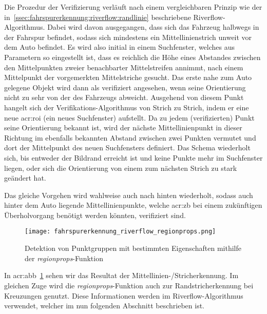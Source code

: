 Die Prozedur der Verifizierung verläuft nach einem vergleichbaren Prinzip wie der in~\ref{ssec:fahrspurerkennung:riverflow:randlinie} beschriebene Riverflow-Algorithmus. Dabei wird davon ausgegangen, dass sich das Fahrzeug halbwegs in der Fahrspur befindet, sodass sich mindestens ein Mittellinienstrich unweit vor dem Auto befindet. Es wird also initial in einem  Suchfenster, welches aus Parametern so eingestellt ist, dass es reichlich die Höhe eines Abstandes zwischen den Mittelpunkten zweier benachbarter Mittelstreifen annimmt, nach einem Mittelpunkt der vorgemerkten Mittelstriche gesucht. Das erste nahe zum Auto gelegene Objekt wird dann als verifiziert angesehen, wenn seine Orientierung nicht zu sehr von der des Fahrzeugs abweicht. Ausgehend von diesem Punkt \glqq hangelt\grqq{} sich der Verifikations-Algorithmus von Strich zu Strich, indem er eine neue \gls{acr:roi} (ein neues Suchfenster) aufstellt. Da zu jedem (verifizierten) Punkt seine Orientierung bekannt ist, wird der nächste Mittellinienpunkt in dieser Richtung im ebenfalls bekannten Abstand zwischen zwei Punkten vermutet und dort der Mittelpunkt des neuen Suchfensters definiert. Das Schema wiederholt sich, bis entweder der Bildrand erreicht ist und keine Punkte mehr im Suchfenster liegen, oder sich die Orientierung von einem zum nächsten Strich zu stark geändert hat.

Das gleiche Vorgehen wird wahlweise auch nach hinten wiederholt, sodass auch hinter dem Auto liegende Mittellinienpunkte, welche \gls{acr:zb} bei einem zukünftigen Überholvorgang benötigt werden könnten, verifiziert sind.

\begin{figure}[htb]
	\centering
	\texttt{[image: fahrspurerkennung\_riverflow\_regionprops.png]}
	\caption{Detektion von Punktgruppen mit bestimmten Eigenschaften mithilfe der \emph{regionprops}-Funktion}
	\label{fig:riverflow:mittellinie:regionprops}
\end{figure}

In \gls{acr:abb}~\ref{fig:riverflow:mittellinie:regionprops} sehen wir das Resultat der Mittellinien-/Stricherkennung. Im gleichen Zuge wird die \emph{regionprops}-Funktion auch zur Randstricherkennung bei Kreuzungen genutzt. Diese Informationen werden im Riverflow-Algorithmus verwendet, welcher im nun folgenden Abschnitt beschrieben ist.